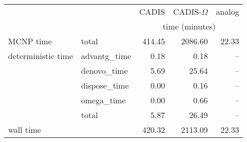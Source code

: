 \begin{tabular}{llrrr}
\toprule
          &             &          CADIS & CADIS-$\Omega$ &         analog \\
        &              & \multicolumn{3}{c}{time (minutes)} \\
\midrule
MCNP time & total &         414.45 &        2086.60 &          22.33 \\
deterministic time & advantg\_time &           0.18 &           0.18 &            -- \\
          & denovo\_time &           5.69 &          25.64 &            -- \\
          & dispose\_time &           0.00 &           0.16 &            -- \\
          & omega\_time &           0.00 &           0.66 &            -- \\
          & total &           5.87 &          26.49 &            -- \\
wall time &              &         420.32 &        2113.09 &          22.33 \\
\bottomrule
\end{tabular}
